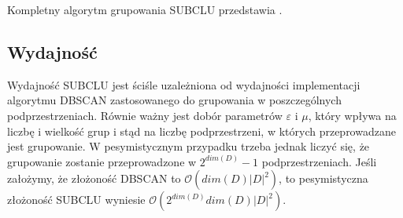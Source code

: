 Kompletny algorytm grupowania SUBCLU przedstawia .



\subsection{Wydajność}
Wydajność SUBCLU jest ściśle uzależniona od wydajności implementacji algorytmu DBSCAN zastosowanego do grupowania w poszczególnych podprzestrzeniach. Równie ważny jest dobór parametrów $ \varepsilon $ i $ \mu $, który wpływa na liczbę i wielkość grup i stąd na liczbę podprzestrzeni, w których przeprowadzane jest grupowanie. W pesymistycznym przypadku trzeba jednak liczyć się, że grupowanie zostanie przeprowadzone w $ 2^{dim(D)}-1 $ podprzestrzeniach. Jeśli założymy, że złożoność DBSCAN to $\mathcal{O}( dim(D)|D|^2 )$, to pesymistyczna złożoność SUBCLU wyniesie $ \mathcal{O}(2^{dim(D)}dim(D)|D|^2) $.